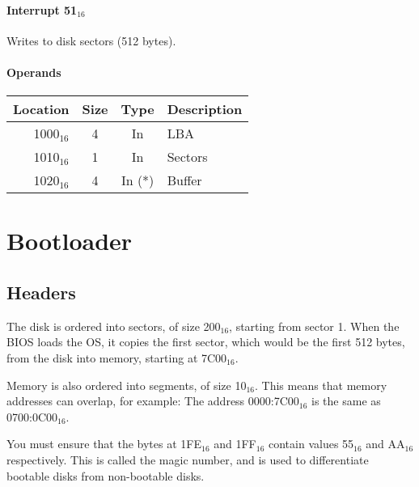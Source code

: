 \documentclass{article}
\begin{document}
\paragraph{Interrupt 51$_{16}$}

Writes to disk sectors (512 bytes).

\paragraph{Operands}

\begin{tabular}{|r|c|c|l|}
	\hline
	\textbf{Location} & \textbf{Size} & \textbf{Type} & \textbf{Description} \\
	\hline
	1000$_{16}$ & 4 & In & LBA \\
	\hline
	1010$_{16}$ & 1 & In & Sectors \\
	\hline
	1020$_{16}$ & 4 & In (*) & Buffer \\
	\hline
\end{tabular}


\newpage

\section{Bootloader}

\subsection{Headers}

The disk is ordered into sectors, of size 200$_{16}$, starting from sector 1\cite{sector size}.
When the BIOS loads the OS, it copies the first sector,
which would be the first 512 bytes, from the disk into memory,
starting at 7C00$_{16}$\cite{7c00}.

Memory is also ordered into segments, of size 10$_{16}$\cite{memory segments}. This means that memory
addresses can overlap, for example:
The address 0000:7C00$_{16}$ is the same as 0700:0C00$_{16}$.

You must ensure that the bytes at 1FE$_{16}$ and 1FF$_{16}$
contain values 55$_{16}$ and AA$_{16}$ respectively\cite{55aa}.
This is called the magic number, and is used to differentiate
bootable disks from non-bootable disks.
\end{document}
